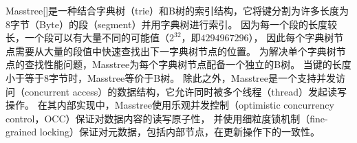 

Masstree[]是一种结合字典树（trie）和B树的索引结构，它将键分割为许多长度为8字节（Byte）的段（segment）并用字典树进行索引。
因为每一个段的长度较长，一个段可以有大量不同的可能值（$2^32$，即$4294967296$），
因此每个字典树节点需要从大量的段值中快速查找出下一字典树节点的位置。
为解决单个字典树节点的查找性能问题，Masstree为每个字典树节点配备一个独立的B树。
当键的长度小于等于8字节时，Masstree等价于B树。
除此之外，Masstree是一个支持并发访问（concurrent access）的数据结构，它允许同时被多个线程（thread）发起读写操作。
在其内部实现中，Masstree使用乐观并发控制（optimistic concurrency control，OCC）保证对数据内容的读写原子性，
并使用细粒度锁机制（fine-grained locking）保证对元数据，包括内部节点，在更新操作下的一致性。

